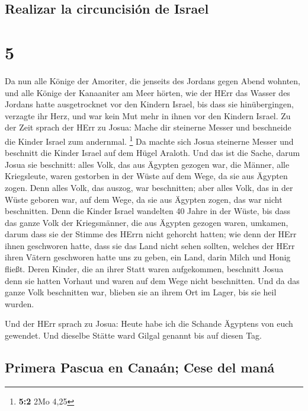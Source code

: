 \hypertarget{realizar-la-circuncisiuxf3n-de-israel}{%
\subsection{Realizar la circuncisión de
Israel}\label{realizar-la-circuncisiuxf3n-de-israel}}

\hypertarget{section-4}{%
\section{5}\label{section-4}}

 Da nun alle Könige der Amoriter, die jenseits des Jordans
gegen Abend wohnten, und alle Könige der Kanaaniter am Meer hörten, wie
der HErr das Wasser des Jordans hatte ausgetrocknet vor den Kindern
Israel, bis dass sie hinübergingen, verzagte ihr Herz, und war kein Mut
mehr in ihnen vor den Kindern Israel.  Zu der Zeit sprach
der HErr zu Josua: Mache dir steinerne Messer und beschneide die Kinder
Israel zum andernmal. \footnote{\textbf{5:2} 2Mo 4,25}  Da
machte sich Josua steinerne Messer und beschnitt die Kinder Israel auf
dem Hügel Araloth.  Und das ist die Sache, darum Josua sie
beschnitt: alles Volk, das aus Ägypten gezogen war, die Männer, alle
Kriegsleute, waren gestorben in der Wüste auf dem Wege, da sie aus
Ägypten zogen.  Denn alles Volk, das auszog, war
beschnitten; aber alles Volk, das in der Wüste geboren war, auf dem
Wege, da sie aus Ägypten zogen, das war nicht beschnitten.
 Denn die Kinder Israel wandelten 40 Jahre in der Wüste,
bis dass das ganze Volk der Kriegsmänner, die aus Ägypten gezogen waren,
umkamen, darum dass sie der Stimme des HErrn nicht gehorcht hatten; wie
denn der HErr ihnen geschworen hatte, dass sie das Land nicht sehen
sollten, welches der HErr ihren Vätern geschworen hatte uns zu geben,
ein Land, darin Milch und Honig fließt.  Deren Kinder, die
an ihrer Statt waren aufgekommen, beschnitt Josua denn sie hatten
Vorhaut und waren auf dem Wege nicht beschnitten.  Und da
das ganze Volk beschnitten war, blieben sie an ihrem Ort im Lager, bis
sie heil wurden.

 Und der HErr sprach zu Josua: Heute habe ich die Schande
Ägyptens von euch gewendet. Und dieselbe Stätte ward Gilgal genannt bis
auf diesen Tag.

\hypertarget{primera-pascua-en-canauxe1n-cese-del-manuxe1}{%
\subsection{Primera Pascua en Canaán; Cese del
maná}\label{primera-pascua-en-canauxe1n-cese-del-manuxe1}}

